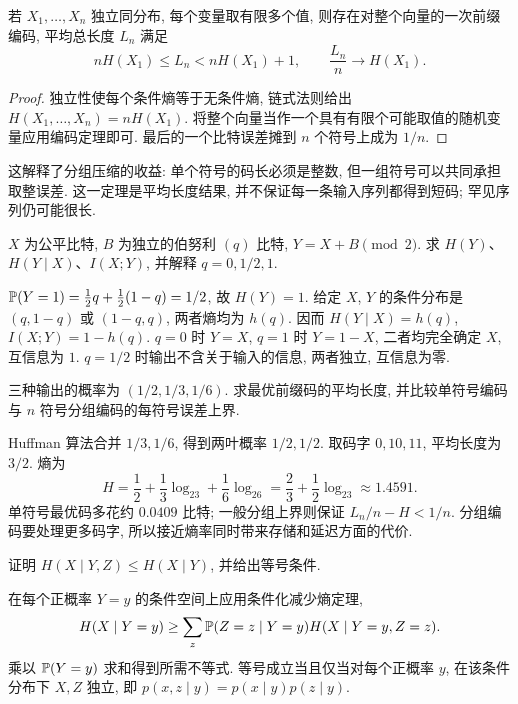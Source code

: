 \begin{corollary}[分组编码接近熵率]
若 $X_1,\ldots,X_n$ 独立同分布, 每个变量取有限多个值, 则存在对整个向量的一次前缀编码, 平均总长度 $L_n$ 满足
\[
 nH(X_1)\leq L_n<nH(X_1)+1,
 \qquad \frac{L_n}{n}\longrightarrow H(X_1).
\]
\end{corollary}
\begin{proof}
独立性使每个条件熵等于无条件熵, 链式法则给出
$H(X_1,\ldots,X_n)=nH(X_1)$. 将整个向量当作一个具有有限个可能取值的随机变量应用编码定理即可. 最后的一个比特误差摊到 $n$ 个符号上成为 $1/n$.
\end{proof}
这解释了分组压缩的收益: 单个符号的码长必须是整数, 但一组符号可以共同承担取整误差. 这一定理是平均长度结果, 并不保证每一条输入序列都得到短码; 罕见序列仍可能很长.

\begin{exercise}
$X$ 为公平比特, $B$ 为独立的伯努利 $(q)$ 比特, $Y=X+B\pmod2$. 求 $H(Y)$、$H(Y\mid X)$、$I(X;Y)$, 并解释 $q=0,1/2,1$.
\end{exercise}
\begin{solution}
$\mathbb P(Y=1)=\tfrac12q+\tfrac12(1-q)=1/2$, 故 $H(Y)=1$. 给定 $X$, $Y$ 的条件分布是 $(q,1-q)$ 或 $(1-q,q)$, 两者熵均为 $h(q)$. 因而 $H(Y\mid X)=h(q)$, $I(X;Y)=1-h(q)$. $q=0$ 时 $Y=X$, $q=1$ 时 $Y=1-X$, 二者均完全确定 $X$, 互信息为 $1$. $q=1/2$ 时输出不含关于输入的信息, 两者独立, 互信息为零.
\end{solution}

\begin{exercise}
三种输出的概率为 $(1/2,1/3,1/6)$. 求最优前缀码的平均长度, 并比较单符号编码与 $n$ 符号分组编码的每符号误差上界.
\end{exercise}
\begin{solution}
Huffman 算法合并 $1/3,1/6$, 得到两叶概率 $1/2,1/2$. 取码字 $0,10,11$, 平均长度为 $3/2$. 熵为
\[
 H=\frac12+\frac13\log_23+\frac16\log_26
 =\frac23+\frac12\log_23\approx1.4591.
\]
单符号最优码多花约 $0.0409$ 比特; 一般分组上界则保证 $L_n/n-H<1/n$. 分组编码要处理更多码字, 所以接近熵率同时带来存储和延迟方面的代价.
\end{solution}

\begin{exercise}
证明 $H(X\mid Y,Z)\leq H(X\mid Y)$, 并给出等号条件.
\end{exercise}
\begin{solution}
在每个正概率 $Y=y$ 的条件空间上应用条件化减少熵定理,
\[
 H(X\mid Y=y)\geq\sum_z\mathbb P(Z=z\mid Y=y)H(X\mid Y=y,Z=z).
\]
乘以 $\mathbb P(Y=y)$ 求和得到所需不等式. 等号成立当且仅当对每个正概率 $y$, 在该条件分布下 $X,Z$ 独立, 即
$p(x,z\mid y)=p(x\mid y)p(z\mid y)$.
\end{solution}
